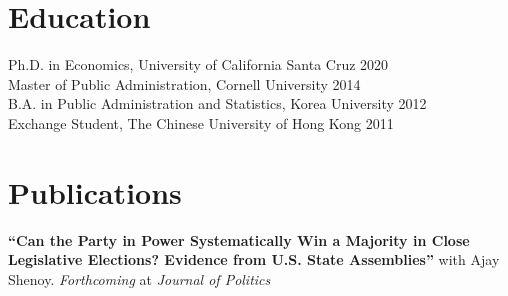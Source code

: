 \documentclass[letterpaper, margin, 10pt]{res} %
\begin{document}
\begin{resume}
\section{\sc \textbf{Education}}
{Ph.D. in Economics, University of California Santa Cruz} \hfill 2020\\
{Master of Public Administration, Cornell University} \hfill 2014\\
{B.A. in Public Administration and Statistics, Korea University} \hfill 2012\\
{ Exchange Student, The Chinese University of Hong Kong} \hfill 2011
%
%




\normalsize\section{\textbf{Publications}}
\normalsize 
{\bf ``{Can the Party in Power Systematically Win a Majority in Close Legislative Elections? Evidence from U.S. State Assemblies}''} with Ajay Shenoy. \textit{Forthcoming} at \textit{Journal of Politics}%



\end{resume}
\end{document}
